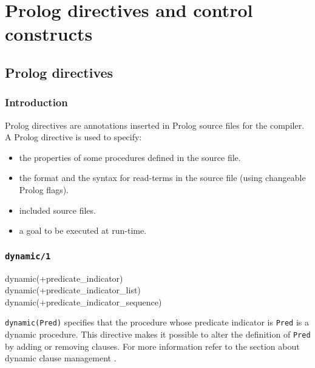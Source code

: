 \newpage
\section{Prolog directives and control constructs}
\subsection{Prolog directives}

\subsubsection{Introduction}
Prolog directives are annotations inserted in Prolog source files for the
compiler. A Prolog directive is used to specify:

\begin{itemize}

\item the properties of some procedures defined in the source file.

\item the format and the syntax for read-terms in the source file (using
changeable Prolog flags).

\item included source files.

\item a goal to be executed at run-time.

\end{itemize}

\subsubsection{\texttt{dynamic/1}}
\label{dynamic/1}

\begin{TemplatesOneCol}
dynamic(+predicate\_indicator)\\
dynamic(+predicate\_indicator\_list)\\
dynamic(+predicate\_indicator\_sequence)

\end{TemplatesOneCol}

\Description

\texttt{dynamic(Pred)} specifies that the procedure whose
predicate indicator is \texttt{Pred} is a dynamic procedure. This directive
makes it possible to alter the definition of \texttt{Pred} by adding or
removing clauses. For more information refer to the section about dynamic
clause management .

